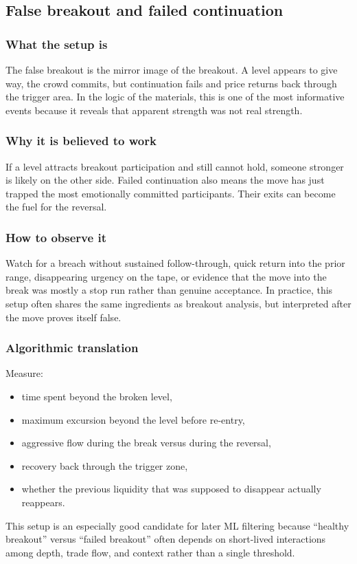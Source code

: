 \subsection{False breakout and failed continuation}

\subsubsection{What the setup is}

The false breakout is the mirror image of the breakout. A level appears to give way, the crowd
commits, but continuation fails and price returns back through the trigger area. In the logic
of the materials, this is one of the most informative events because it reveals that apparent
strength was not real strength.

\subsubsection{Why it is believed to work}

If a level attracts breakout participation and still cannot hold, someone stronger is likely on
the other side. Failed continuation also means the move has just trapped the most emotionally
committed participants. Their exits can become the fuel for the reversal.

\subsubsection{How to observe it}

Watch for a breach without sustained follow-through, quick return into the prior range,
disappearing urgency on the tape, or evidence that the move into the break was mostly a stop
run rather than genuine acceptance. In practice, this setup often shares the same ingredients as
breakout analysis, but interpreted after the move proves itself false.

\subsubsection{Algorithmic translation}

Measure:

\begin{itemize}[leftmargin=1.4em]
  \item time spent beyond the broken level,
  \item maximum excursion beyond the level before re-entry,
  \item aggressive flow during the break versus during the reversal,
  \item recovery back through the trigger zone,
  \item whether the previous liquidity that was supposed to disappear actually reappears.
\end{itemize}

This setup is an especially good candidate for later ML filtering because ``healthy breakout''
versus ``failed breakout'' often depends on short-lived interactions among depth, trade flow,
and context rather than a single threshold.
